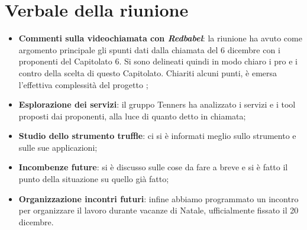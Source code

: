 \section{Verbale della riunione}
	\begin{itemize}
		\item \textbf{Commenti sulla videochiamata con \textit{Redbabel}}:
        la riunione ha avuto come argomento principale gli spunti dati dalla chiamata del 6 dicembre con i proponenti del Capitolato 6. Si sono delineati quindi in modo chiaro i pro e i contro della scelta di questo Capitolato. Chiariti alcuni punti, è emersa l'effettiva complessità del progetto ;
		\item \textbf{Esplorazione dei servizi}:
		il gruppo Tenners ha analizzato i servizi e i tool proposti dai proponenti, alla luce di quanto detto in chiamata;
		\item \textbf{Studio dello strumento truffle}: ci si è informati meglio sullo strumento  e sulle sue applicazioni;
        \item \textbf{Incombenze future}: si è discusso sulle cose da fare a breve e si è fatto il punto della situazione su quello già fatto;
		\item \textbf{Organizzazione incontri futuri}: infine abbiamo programmato un incontro per organizzare il lavoro durante vacanze di Natale, ufficialmente fissato il 20 dicembre.
	\end{itemize}
